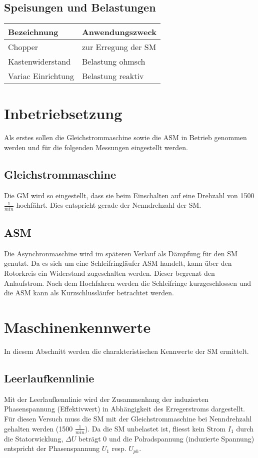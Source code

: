 \begin{flushleft}
\subsection{Speisungen und Belastungen}

\begin{tabular}{|L{0.3 \textwidth}|l|}
 \hline
  \textbf{Bezeichnung} & \textbf{Anwendungszweck}  \\
 \hline
 Chopper  & zur Erregung der SM  \\
\hline
Kastenwiderstand & Belastung ohmsch  \\
\hline
 Variac Einrichtung & Belastung reaktiv  \\
\hline

\end{tabular}



\newpage
\section{Inbetriebsetzung}
Als erstes sollen die Gleichstrommaschine sowie die ASM in Betrieb genommen werden und für die folgenden Messungen eingestellt werden.
\subsection{Gleichstrommaschine}
Die GM wird so eingestellt, dass sie beim Einschalten auf eine Drehzahl von 1500 $\frac{1}{min}$ hochfährt. Dies entspricht gerade der Nenndrehzahl der SM.

\subsection{ASM}
Die Asynchronmaschine wird im späteren Verlauf als Dämpfung für den SM genutzt. 
Da es sich um eine Schleifringläufer ASM handelt, kann über den Rotorkreis ein Widerstand zugeschalten werden. Dieser begrenzt den Anlaufstrom. Nach dem Hochfahren werden die Schleifringe kurzgeschlossen und die ASM kann als Kurzschlussläufer betrachtet werden.


\newpage



\section{Maschinenkennwerte}
In diesem Abschnitt werden die charakteristischen Kennwerte der SM ermittelt.

\subsection{Leerlaufkennlinie}
Mit der Leerlaufkennlinie wird der Zusammenhang der induzierten Phasenspannung (Effektivwert) in Abhängigkeit des Erregerstroms dargestellt. Für diesen Versuch muss die SM mit der Gleichstrommaschine bei Nenndrehzahl gehalten werden (1500 $\frac{1}{min}$).
Da die SM unbelastet ist, fliesst kein Strom $I_1$ durch die Statorwicklung, $\Delta U$ beträgt 0 und die Polradspannung (induzierte Spannung) entspricht der Phasenspannung $U_1$ resp. $U_{ph}$. \\



\end{flushleft}
